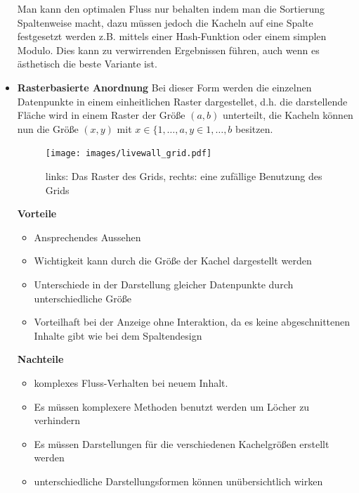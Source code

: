 \documentclass[12pt,twoside]{book}
\begin{document}
\begin{itemize}
Man kann den optimalen Fluss nur behalten indem man die Sortierung Spaltenweise macht, dazu müssen jedoch die Kacheln auf eine Spalte festgesetzt werden z.B. mittels einer Hash-Funktion oder einem simplen Modulo. Dies kann zu verwirrenden Ergebnissen führen, auch wenn es ästhetisch die beste Variante ist.

  \item \textbf{Rasterbasierte Anordnung}
  Bei dieser Form werden die einzelnen Datenpunkte in einem einheitlichen Raster dargestellet, d.h. die darstellende Fläche wird in einem Raster der Größe $(a, b)$ unterteilt, die Kacheln können nun die Größe $(x, y)$ mit $ x \in \{1, \dots, a, y \in 1, \dots, b$ besitzen.

  \begin{figure}[H]
    \centering
    \texttt{[image: images/livewall\_grid.pdf]}
    \caption{links: Das Raster des Grids, rechts: eine zufällige Benutzung des Grids}
    \label{fig:awesome_image}
  \end{figure}

  \textbf{Vorteile} \\
  \begin{itemize}
    \item Ansprechendes Aussehen
    \item Wichtigkeit kann durch die Größe der Kachel dargestellt werden
    \item Unterschiede in der Darstellung gleicher Datenpunkte durch unterschiedliche Größe
    \item Vorteilhaft bei der Anzeige ohne Interaktion, da es keine abgeschnittenen Inhalte gibt wie bei dem Spaltendesign
  \end{itemize}

  \textbf{Nachteile}\\
  \begin{itemize}
    \item komplexes Fluss-Verhalten bei neuem Inhalt.
    \item Es müssen komplexere Methoden benutzt werden um Löcher zu verhindern
    \item Es müssen Darstellungen für die verschiedenen Kachelgrößen erstellt werden
    \item unterschiedliche Darstellungsformen können unübersichtlich wirken
  \end{itemize}


\end{itemize}
\end{document}
